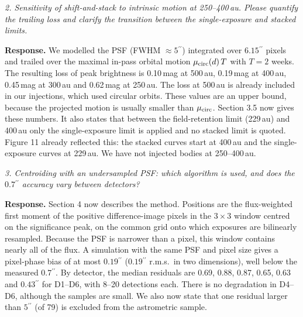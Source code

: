 \documentclass[11pt]{article}
\newcommand{\arcsec}{\ensuremath{^{\prime\prime}}}
\newenvironment{referee}{\par\color{black!60}\itshape}{\par}
\newcommand{\resp}{\par\noindent\textbf{Response.} }
\begin{document}
\begin{referee}
2. Sensitivity of shift-and-stack to intrinsic motion at 250--400\,au. Please quantify the trailing loss and clarify the transition between the single-exposure and stacked limits.
\end{referee}
\resp We modelled the PSF (FWHM $\approx 5\arcsec$) integrated over $6.15\arcsec$ pixels and trailed over the maximal in-pass orbital motion $\mu_{\rm circ}(d)\,T$ with $T = 2$ weeks. The resulting loss of peak brightness is 0.10\,mag at 500\,au, 0.19\,mag at 400\,au, 0.45\,mag at 300\,au and 0.62\,mag at 250\,au. The loss at 500\,au is already included in our injections, which used circular orbits. These values are an upper bound, because the projected motion is usually smaller than $\mu_{\rm circ}$. Section 3.5 now gives these numbers. It also states that between the field-retention limit (229\,au) and 400\,au only the single-exposure limit is applied and no stacked limit is quoted. Figure 11 already reflected this: the stacked curves start at 400\,au and the single-exposure curves at 229\,au. We have not injected bodies at 250--400\,au.

\begin{referee}
3. Centroiding with an undersampled PSF: which algorithm is used, and does the $0.7\arcsec$ accuracy vary between detectors?
\end{referee}
\resp Section 4 now describes the method. Positions are the flux-weighted first moment of the positive difference-image pixels in the $3\times3$ window centred on the significance peak, on the common grid onto which exposures are bilinearly resampled. Because the PSF is narrower than a pixel, this window contains nearly all of the flux. A simulation with the same PSF and pixel size gives a pixel-phase bias of at most $0.19\arcsec$ ($0.19\arcsec$ r.m.s.\ in two dimensions), well below the measured $0.7\arcsec$. By detector, the median residuals are 0.69, 0.88, 0.87, 0.65, 0.63 and $0.43\arcsec$ for D1--D6, with 8--20 detections each. There is no degradation in D4--D6, although the samples are small. We also now state that one residual larger than $5\arcsec$ (of 79) is excluded from the astrometric sample.
\end{document}
